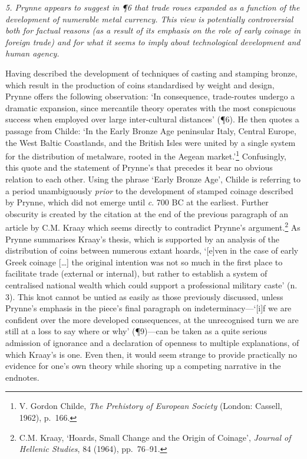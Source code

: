 \documentclass[]{article}
\begin{document}
\emph{5. Prynne appears to suggest in ¶6 that trade roues expanded as a
function of the development of numerable metal currency. This view is
potentially controversial both for factual reasons (as a result of its
emphasis on the role of early coinage in foreign trade) and for what it
seems to imply about technological development and human agency.}

Having described the development of techniques of casting and stamping
bronze, which result in the production of coins standardised by weight
and design, Prynne offers the following observation: `In consequence,
trade-routes undergo a dramatic expansion, since mercantile theory
operates with the most conspicuous success when employed over large
inter-cultural distances' (¶6). He then quotes a passage from Childe:
`In the Early Bronze Age peninsular Italy, Central Europe, the West
Baltic Coastlands, and the British Isles were united by a single system
for the distribution of metalware, rooted in the Aegean
market.'\footnote{V. Gordon Childe, \emph{The Prehistory of European
  Society} (London: Cassell, 1962), p.~166.} Confusingly, this quote and
the statement of Prynne's that precedes it bear no obvious relation to
each other. Using the phrase `Early Bronze Age', Childe is referring to
a period unambiguously \emph{prior} to the development of stamped
coinage described by Prynne, which did not emerge until \emph{c}. 700 BC
at the earliest. Further obscurity is created by the citation at the end
of the previous paragraph of an article by C.M. Kraay which seems
directly to contradict Prynne's argument.\footnote{C.M. Kraay, `Hoards,
  Small Change and the Origin of Coinage', \emph{Journal of Hellenic
  Studies}, 84 (1964), pp.~76--91.} As Prynne summarises Kraay's thesis,
which is supported by an analysis of the distribution of coins between
numerous extant hoards, `{[}e{]}ven in the case of early Greek coinage
{[}\ldots{}{]} the original intention was not so much in the first place
to facilitate trade (external or internal), but rather to establish a
system of centralised national wealth which could support a professional
military caste' (n. 3). This knot cannot be untied as easily as those
previously discussed, unless Prynne's emphasis in the piece's final
paragraph on indeterminacy---`{[}i{]}f we are confident over the more
developed consequences, at the unrecognised turn we are still at a loss
to say where or why' (¶9)---can be taken as a quite serious admission of
ignorance and a declaration of openness to multiple explanations, of
which Kraay's is one. Even then, it would seem strange to provide
practically no evidence for one's own theory while shoring up a
competing narrative in the endnotes.
\end{document}

